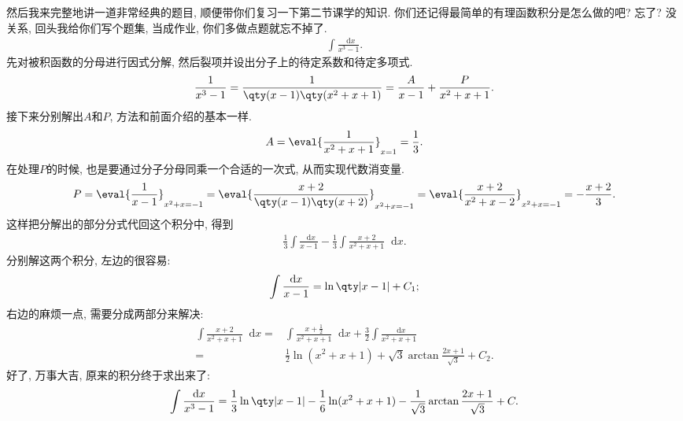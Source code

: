 \documentclass{ctexbook}
\newcommand*{\dif}{\mathop{}\!\mathrm{d}}
\begin{document}
{然后我来完整地讲一道非常经典的题目, 顺便带你们复习一下第二节课学的知识. 你们还记得最简单的有理函数积分是怎么做的吧? 忘了? 没关系, 回头我给你们写个题集, 当成作业, 你们多做点题就忘不掉了. 
\begin{align*}
\int\frac{\dif{x}}{x^{3}-1}
.\end{align*}
先对被积函数的分母进行因式分解, 然后裂项并设出分子上的待定系数和待定多项式. 
\begin{align*}
\frac{1}{x^{3}-1}=\frac{1}{\qty(x-1)\qty(x^{2}+x+1)}=\frac{A}{x-1}+\frac{P}{x^{2}+x+1}
.\end{align*}
接下来分别解出$A$和$P$, 方法和前面介绍的基本一样. 
\begin{align*}
A=\eval{\frac{1}{x^{2}+x+1}}_{x=1}=\frac{1}{3}
.\end{align*}
在处理$P$的时候, 也是要通过分子分母同乘一个合适的一次式, 从而实现代数消变量. 
\begin{align*}
P=\eval{\frac{1}{x-1}}_{x^{2}+x=-1}=\eval{\frac{x+2}{\qty(x-1)\qty(x+2)}}_{x^{2}+x=-1}=\eval{\frac{x+2}{x^{2}+x-2}}_{x^{2}+x=-1}=-\frac{x+2}{3}
.\end{align*}
这样把分解出的部分分式代回这个积分中, 得到
\begin{align*}
\frac{1}{3}\int\frac{\dif{x}}{x-1}-\frac{1}{3}\int\frac{x+2}{x^{2}+x+1}\dif{x}
.\end{align*}
分别解这两个积分, 左边的很容易: 
\begin{align*}
\int\frac{\dif{x}}{x-1}=\ln\qty|x-1|+C_{1}
;\end{align*}
右边的麻烦一点, 需要分成两部分来解决: 
\begin{align*}
\int\frac{x+2}{x^{2}+x+1}\dif{x}={}&\int\frac{x+\frac{1}{2}}{x^{2}+x+1}\dif{x}+\frac{3}{2}\int\frac{\dif{x}}{x^{2}+x+1}\\
={}&\frac{1}{2}\ln(x^{2}+x+1)+\sqrt{3}\arctan{\frac{2x+1}{\sqrt{3}}}+C_{2}
.\end{align*}
好了, 万事大吉, 原来的积分终于求出来了: 
\begin{align*}
\int\frac{\dif{x}}{x^{3}-1}=\frac{1}{3}\ln\qty|x-1|-\frac{1}{6}\ln(x^{2}+x+1)-\frac{1}{\sqrt{3}}\arctan{\frac{2x+1}{\sqrt{3}}}+C
.\end{align*}
}
\end{document}
